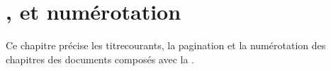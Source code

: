 \chapter[Titres courants, pagination et numérotation]{\texorpdfstring{}{Titres courants},  et numérotation}\label{cha-pagination}
%
%
%

Ce chapitre précise les \glspl{titrecourant}, la \gls{pagination} et la
numérotation des chapitres des documents composés avec la \yatCl{}.

